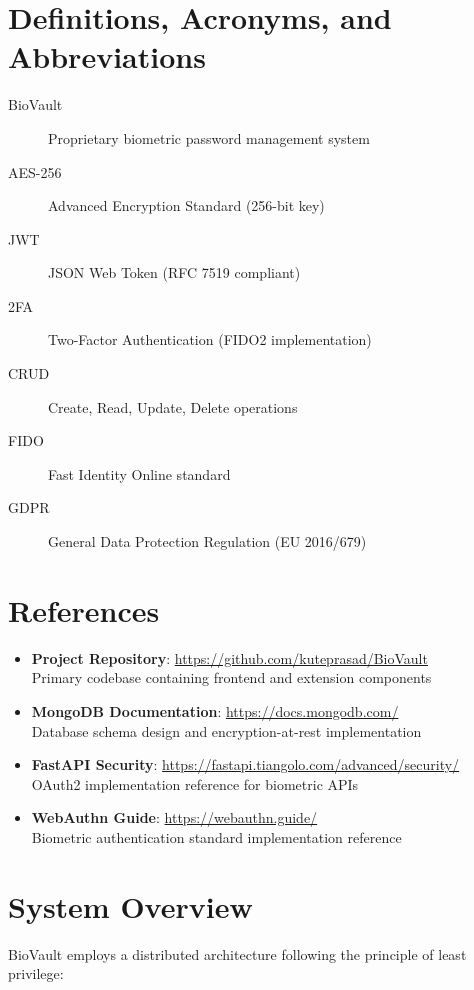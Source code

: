 \documentclass{scrreprt}
\begin{document}
\section{Definitions, Acronyms, and Abbreviations}
\label{sec:definitions}
\begin{description}
    \item[BioVault] Proprietary biometric password management system
    \item[AES-256] Advanced Encryption Standard (256-bit key)
    \item[JWT] JSON Web Token (RFC 7519 compliant)
    \item[2FA] Two-Factor Authentication (FIDO2 implementation)
    \item[CRUD] Create, Read, Update, Delete operations
    \item[FIDO] Fast Identity Online standard
    \item[GDPR] General Data Protection Regulation (EU 2016/679)
\end{description}

\section{References}
\label{sec:references}
\begin{itemize}
    \item \textbf{Project Repository}: \url{https://github.com/kuteprasad/BioVault} \\
    \footnotesize{Primary codebase containing frontend and extension components}
    
    \item \textbf{MongoDB Documentation}: \url{https://docs.mongodb.com/} \\
    \footnotesize{Database schema design and encryption-at-rest implementation}
    
    \item \textbf{FastAPI Security}: \url{https://fastapi.tiangolo.com/advanced/security/} \\
    \footnotesize{OAuth2 implementation reference for biometric APIs}
    
    \item \textbf{WebAuthn Guide}: \url{https://webauthn.guide/} \\
    \footnotesize{Biometric authentication standard implementation reference}
\end{itemize}

\section{System Overview}
\label{sec:system-overview}
BioVault employs a distributed architecture following the principle of least privilege:
\end{document}
